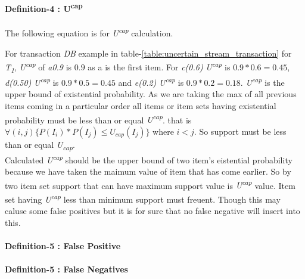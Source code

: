     \paragraph{Definition-4 : U\textsuperscript{cap}} 
    The following equation is for \emph{U\textsuperscript{cap}}    calculation.
    
    For transaction \emph{DB} example in table-\ref{table:uncertain_stream_transaction} for \emph{T\textsubscript{1}}, \emph{U\textsuperscript{cap}} of \emph{a{0.9}} is $0.9$ as a is the first item. For \emph{c(0.6)} \emph{U\textsuperscript{cap}} is $0.9*0.6=0.45$, \emph{d(0.50)} \emph{U\textsuperscript{cap}} is $0.9*0.5=0.45$ and \emph{e(0.2)} \emph{U\textsuperscript{cap}} is $0.9*0.2=0.18$. \emph{U\textsuperscript{cap}} is the upper bound of existential probability. As we are taking the max of all previous items coming in a particular order all items or item sets having existential probability must be less than or equal \emph{U\textsuperscript{cap}}. that is $\forall(i,j)\{ P(I_i)*P(I_j)\leq U_{cap}(I_j)\}$ where $i < j$. So support must be less than or equal \emph{U\textsubscript{cap}}.\\
    Calculated \emph{U\textsuperscript{cap}} should be the upper bound of two item's eistential probability because we have taken the maimum value of item that has come earlier. So by two item set support that can have maximum support value is \emph{U\textsuperscript{cap}} value. Item set having \emph{U\textsuperscript{cap}} less than minimum support must freuent. Though this may caluse some false positives but it is for sure that no false negative will insert into this. 
    
    \paragraph{Definition-5 : False Positive}
    \paragraph{Definition-5 : False Negatives}
    
